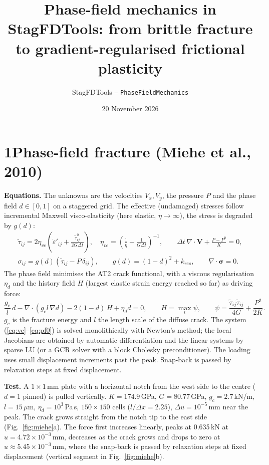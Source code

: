 \documentclass[10pt,a4paper]{article}
\title{\vspace{-1.2cm}Phase-field mechanics in StagFDTools: from brittle fracture\\ to gradient-regularised frictional plasticity}
\author{StagFDTools -- \texttt{PhaseFieldMechanics}}
\date{20 November 2026}
\begin{document}
\maketitle
\vspace{-0.8cm}

\section*{1\quad Phase-field fracture (Miehe et al., 2010)}
\textbf{Equations.} The unknowns are the velocities $V_x, V_y$, the pressure $P$ and the phase field $d\in[0,1]$ on a
staggered grid. The effective (undamaged) stresses follow incremental Maxwell visco-elasticity (here elastic,
$\eta\to\infty$), the stress is degraded by $g(d)$:
\begin{gather}
\tilde\tau_{ij} = 2\eta_{ve}\left(\dot\varepsilon'_{ij} + \frac{\tilde\tau^0_{ij}}{2G\Delta t}\right),\quad
\eta_{ve} = \left(\frac1\eta + \frac1{G\Delta t}\right)^{-1},\qquad
\Delta t\,\nabla\cdot\boldsymbol V + \frac{P - P^0}{K} = 0, \label{eq:ve}\\
\sigma_{ij} = g(d)\left(\tilde\tau_{ij} - P\,\delta_{ij}\right),\qquad g(d) = (1-d)^2 + k_{res},\qquad
\nabla\cdot\boldsymbol\sigma = 0 . \label{eq:mom}
\end{gather}
The phase field minimises the AT2 crack functional, with a viscous regularisation $\eta_d$ and the history field
$H$ (largest elastic strain energy reached so far) as driving force:
\begin{equation}
\frac{g_c}{l}\,d - \nabla\cdot\left(g_c l\,\nabla d\right) - 2(1-d)\,H + \eta_d\dot d = 0,\qquad
H = \max_{t}\psi,\qquad \psi = \frac{\tilde\tau_{ij}\tilde\tau_{ij}}{4G} + \frac{P^2}{2K}.
\label{eq:pf0}
\end{equation}
$g_c$ is the fracture energy and $l$ the length scale of the diffuse crack. The system
(\ref{eq:ve}--\ref{eq:pf0}) is solved monolithically with Newton's method; the local Jacobians are obtained by
automatic differentiation and the linear systems by sparse LU (or a GCR solver with a block Cholesky
preconditioner). The loading uses small displacement increments past the peak. Snap-back is passed by relaxation
steps at fixed displacement.

\textbf{Test.} A $1\times1$\,mm plate with a horizontal notch from the west side to the centre ($d=1$ pinned) is
pulled vertically. $K=174.9$\,GPa, $G=80.77$\,GPa, $g_c=2.7$\,kN/m, $l=15\,\mu$m, $\eta_d=10^3$\,Pa\,s,
$150\times150$ cells ($l/\Delta x = 2.25$), $\Delta u = 10^{-5}$\,mm near the peak. The crack grows straight from the
notch tip to the east side (Fig.~\ref{fig:miehe}a). The force first increases linearly, peaks at
0.635\,kN at $u=4.72\times10^{-3}$\,mm, decreases as the crack grows and drops to zero at
$u\approx5.45\times10^{-3}$\,mm, where the snap-back is passed by relaxation steps at fixed displacement
(vertical segment in Fig.~\ref{fig:miehe}b).
\end{document}
